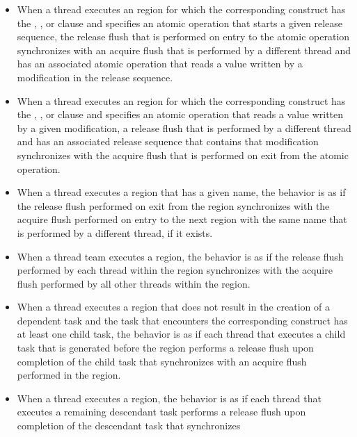 \begin{itemize}
\item When a thread executes an  region for which the
      corresponding construct has the , , or
       clause and specifies an atomic operation that starts a
      given release sequence, the release flush that is performed on entry to
      the atomic operation synchronizes with an acquire flush that is
      performed by a different thread and has an associated atomic operation
      that reads a value written by a modification in the release sequence.
\item When a thread executes an  region for which the
      corresponding construct has the , , or
       clause and specifies an atomic operation that reads a
      value written by a given modification, a release flush that is performed
      by a different thread and has an associated release sequence that
      contains that modification synchronizes with the acquire flush that is
      performed on exit from the atomic operation.
\item When a thread executes a  region that has a given
      name, the behavior is as if the release flush performed on exit from
      the region synchronizes with the acquire flush performed on entry to
      the next  region with the same name that is performed
      by a different thread, if it exists.
\item When a thread team executes a  region, the
      behavior is as if the release flush performed by each thread within
      the region synchronizes with the acquire flush performed by all other
      threads within the region.
\item When a thread executes a  region that does not result in
      the creation of a dependent task and the task that encounters the
      corresponding  construct has at least one child task, the
      behavior is as if each thread that executes a child task that is
      generated before the  region performs a release flush upon
      completion of the child task that synchronizes with an acquire flush
      performed in the  region.
\item When a thread executes a  region, the behavior is as
      if each thread that executes a remaining descendant task performs a
      release flush upon completion of the descendant task that synchronizes

\end{itemize}
